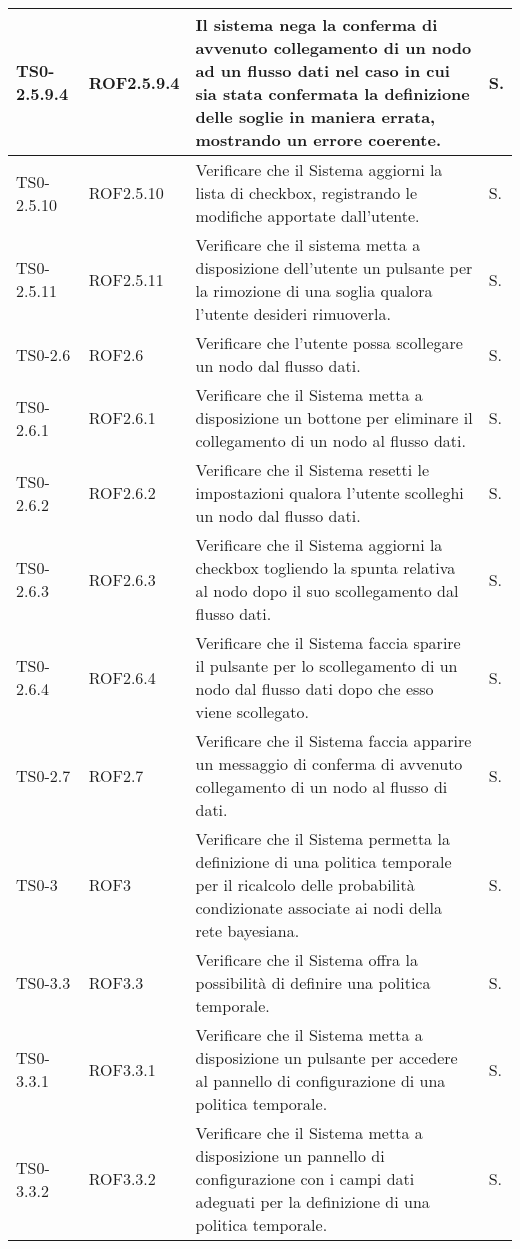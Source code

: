 \begin{longtable}{|C{.15\textwidth}|C{.14\textwidth}|m{.52\textwidth}|m{.08\textwidth}|}
\hline
TS0-2.5.9.4 & ROF2.5.9.4  & Il sistema nega la conferma di avvenuto collegamento di un nodo ad un flusso dati nel caso in cui sia stata confermata la definizione delle soglie in maniera errata, mostrando un errore coerente. & S. \\
\hline
{}TS0-2.5.10 & ROF2.5.10 & Verificare che il Sistema aggiorni la lista di checkbox, registrando le modifiche apportate dall'utente. & S. \\
\hline
TS0-2.5.11 & ROF2.5.11  & Verificare che il sistema metta a disposizione dell'utente un pulsante per la rimozione di una soglia qualora l'utente desideri rimuoverla. & S. \\
\hline
{} TS0-2.6 & ROF2.6 & Verificare che l'utente possa scollegare un nodo dal flusso dati. & S. \\
\hline
TS0-2.6.1 & ROF2.6.1 & Verificare che il Sistema metta a disposizione un bottone per eliminare il collegamento di un nodo al flusso dati. & S. \\
\hline
{}TS0-2.6.2 & ROF2.6.2 & Verificare che il Sistema resetti le impostazioni qualora l'utente scolleghi un nodo dal flusso dati. & S. \\
\hline
TS0-2.6.3 & ROF2.6.3 & Verificare che il Sistema aggiorni la checkbox togliendo la spunta relativa al nodo dopo il suo scollegamento dal flusso dati. & S. \\
\hline
{}TS0-2.6.4 & ROF2.6.4 & Verificare che il Sistema faccia sparire il pulsante per lo scollegamento di un nodo dal flusso dati dopo che esso viene scollegato. & S. \\
\hline
TS0-2.7 & ROF2.7 & Verificare che il Sistema faccia apparire un messaggio di conferma di avvenuto collegamento di un nodo al flusso di dati. & S. \\
\hline
{}TS0-3 & ROF3 & Verificare che il Sistema permetta la definizione di una politica temporale per il ricalcolo delle probabilità condizionate associate ai nodi della rete bayesiana. & S. \\
\hline
TS0-3.3 & ROF3.3 & Verificare che il Sistema offra la possibilità di definire una politica temporale. & S. \\
\hline
{}TS0-3.3.1 & ROF3.3.1 & Verificare che il Sistema metta a disposizione un pulsante per accedere al pannello di configurazione di una politica temporale. & S. \\
\hline
TS0-3.3.2 & ROF3.3.2 & Verificare che il Sistema metta a disposizione un pannello di configurazione con i campi dati adeguati per la definizione di una politica temporale. & S. \\

\end{longtable}
